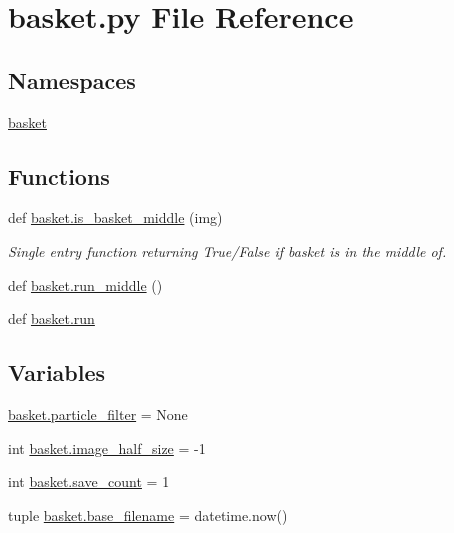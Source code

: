 \section{basket.\+py File Reference}
\label{basket_8py}
\subsection*{Namespaces}
\begin{DoxyCompactItemize}
\item 
 \hyperlink{namespacebasket}{basket}
\end{DoxyCompactItemize}
\subsection*{Functions}
\begin{DoxyCompactItemize}
\item 
def \hyperlink{namespacebasket_a6244ca5fd7cf7706c81e45e270087d17}{basket.\+is\+\_\+basket\+\_\+middle} (img)
\begin{DoxyCompactList}\small\item\em Single entry function returning True/\+False if basket is in the middle of. \end{DoxyCompactList}\item 
def \hyperlink{namespacebasket_a0cb50ef447247bf29a40cbdfcd275bc0}{basket.\+run\+\_\+middle} ()
\item 
def \hyperlink{namespacebasket_a00c6a996da6d264c30c7b6c710cacddc}{basket.\+run}
\end{DoxyCompactItemize}
\subsection*{Variables}
\begin{DoxyCompactItemize}
\item 
\hyperlink{namespacebasket_ae8e523df739d65470eb5eba16867f329}{basket.\+particle\+\_\+filter} = None
\item 
int \hyperlink{namespacebasket_a3c352b285b29250f904de2d4ad7fddaa}{basket.\+image\+\_\+half\+\_\+size} = -\/1
\item 
int \hyperlink{namespacebasket_a3d020674941ec4faf6734391ca082c40}{basket.\+save\+\_\+count} = 1
\item 
tuple \hyperlink{namespacebasket_aa3007fa12430ca814f5bf5890bb2fb0f}{basket.\+base\+\_\+filename} = datetime.\+now()
\end{DoxyCompactItemize}
